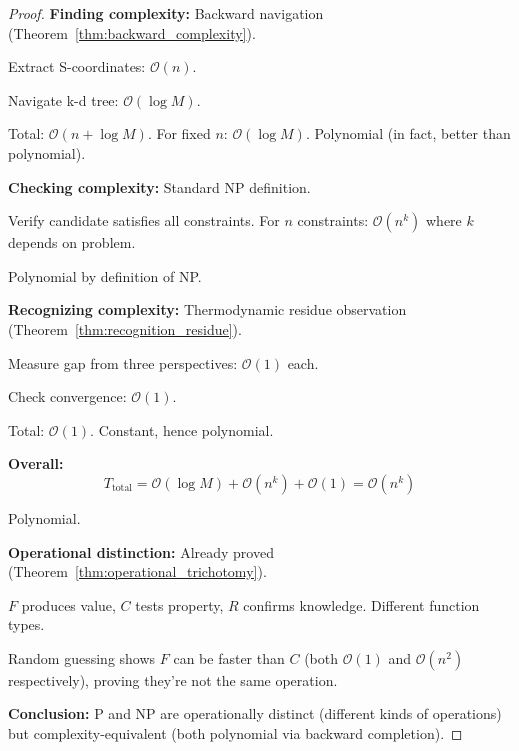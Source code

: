 \documentclass[twocolumn,10pt]{article}
\theoremstyle{definition}
\theoremstyle{remark}
\newcommand{\bigO}{\mathcal{O}}
\begin{document}
\begin{proof}
\textbf{Finding complexity:} Backward navigation (Theorem~\ref{thm:backward_complexity}).

Extract S-coordinates: $\bigO(n)$.

Navigate k-d tree: $\bigO(\log M)$.

Total: $\bigO(n + \log M)$. For fixed $n$: $\bigO(\log M)$. Polynomial (in fact, better than polynomial).

\vspace{0.2cm}
\noindent\textbf{Checking complexity:} Standard NP definition.

Verify candidate satisfies all constraints. For $n$ constraints: $\bigO(n^k)$ where $k$ depends on problem.

Polynomial by definition of NP.

\vspace{0.2cm}
\noindent\textbf{Recognizing complexity:} Thermodynamic residue observation (Theorem~\ref{thm:recognition_residue}).

Measure gap from three perspectives: $\bigO(1)$ each.

Check convergence: $\bigO(1)$.

Total: $\bigO(1)$. Constant, hence polynomial.

\vspace{0.2cm}
\noindent\textbf{Overall:}
\begin{equation}
T_{\text{total}} = \bigO(\log M) + \bigO(n^k) + \bigO(1) = \bigO(n^k)
\end{equation}

Polynomial.

\vspace{0.2cm}
\noindent\textbf{Operational distinction:} Already proved (Theorem~\ref{thm:operational_trichotomy}).

$F$ produces value, $C$ tests property, $R$ confirms knowledge. Different function types.

Random guessing shows $F$ can be faster than $C$ (both $\bigO(1)$ and $\bigO(n^2)$ respectively), proving they're not the same operation.

\vspace{0.2cm}
\noindent\textbf{Conclusion:} P and NP are operationally distinct (different kinds of operations) but complexity-equivalent (both polynomial via backward completion).
\end{proof}
\end{document}

